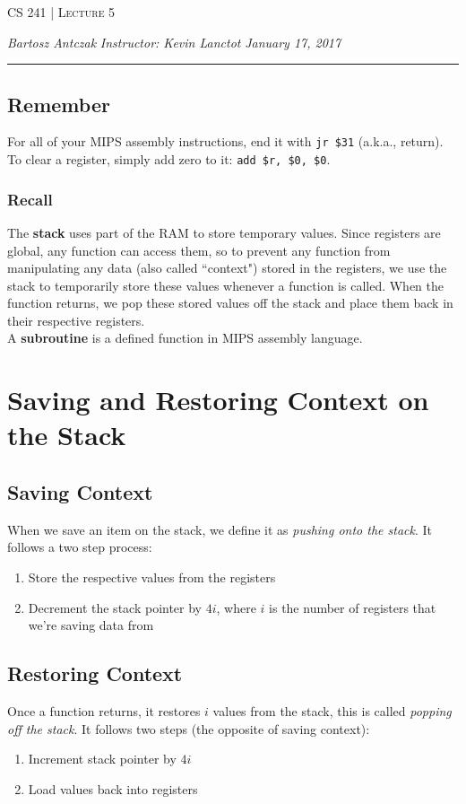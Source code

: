 \documentclass{report}
\newcommand{\lectureNum}{5}
\newcommand{\curDate}{January 17, 2017}
\newcommand{\course}{CS 241}
\newcommand{\instructor}{Kevin Lanctot}
\begin{document}
\begin{center}
\begin{Large}
\textsc{\course{} | Lecture \lectureNum{}}
\end{Large}
\end{center} 
\noindent \textit{Bartosz Antczak} \hfill
\textit{Instructor: \instructor{}} \hfill
\textit{\curDate{}}
\rule{\textwidth}{0.4pt}
\subsection{Remember}
For all of your MIPS assembly instructions, end it with \texttt{jr \$31} (a.k.a., return).\\
To clear a register, simply add zero to it: \texttt{add \$r, \$0, \$0}.
\subsubsection{Recall}
The \textbf{stack} uses part of the RAM to store temporary values. Since registers are global, any function can access them, so to prevent any function from manipulating any data (also called ``context") stored in the registers, we use the stack to temporarily store these values whenever a function is called. When the function returns, we pop these stored values off the stack and place them back in their respective registers.\\
A \textbf{subroutine} is a defined function in MIPS assembly language.
\section{Saving and Restoring Context on the Stack}
\subsection{Saving Context}
When we save an item on the stack, we define it as \textit{pushing onto the stack}. It follows a two step process:
\begin{enumerate}
\item Store the respective values from the registers
\item Decrement the stack pointer by $4i$, where $i$ is the number of registers that we're saving data from
\end{enumerate}
\subsection{Restoring Context}
Once a function returns, it restores $i$ values from the stack, this is called \textit{popping off the stack}. It follows two steps (the opposite of saving context):
\begin{enumerate}
\item Increment stack pointer by $4i$
\item Load values back into registers
\end{enumerate}
\end{document}
